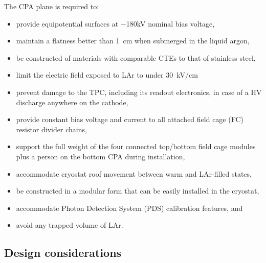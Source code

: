 
The CPA plane is required to:
\begin{itemize}
\item provide equipotential surfaces at $-$180kV nominal bias voltage,
\item maintain a flatness better than 1~cm when submerged in the liquid argon,
\item be constructed of materials with comparable CTEs to that of stainless steel, 
\item limit the electric field exposed to LAr to under 30~kV/cm 
\item prevent damage to the TPC, including its readout electronics, in case of a HV discharge anywhere on the cathode,
\item provide constant bias voltage and current to all attached field cage (FC) resistor divider chains,
\item support the full weight of the four connected top/bottom field cage modules plus a person on the bottom CPA  during installation,
\item accommodate cryostat roof movement between warm and LAr-filled states,
\item be constructed in a modular form that can be easily installed in the cryostat,
\item accommodate Photon Detection System (PDS) calibration features, and
\item avoid any trapped volume of LAr.
\end{itemize}

\subsection{Design considerations}


